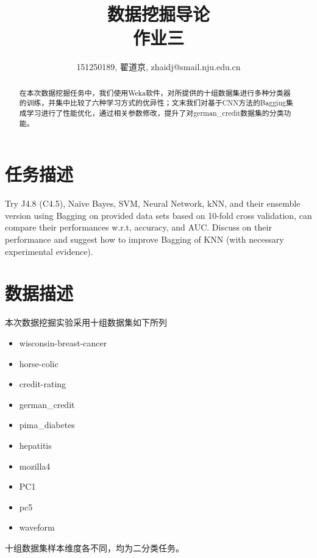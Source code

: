 \documentclass[a4paper,UTF8]{article}
\numberwithin{equation}{section}
\begin{document}
\title{数据挖掘导论\\
作业三}
\author{151250189, 翟道京, zhaidj@smail.nju.edu.cn}
\maketitle

\begin{abstract}
\large{在本次数据挖掘任务中，我们使用Weka软件，对所提供的十组数据集进行多种分类器的训练，并集中比较了六种学习方式的优异性；文末我们对基于CNN方法的Bagging集成学习进行了性能优化，通过相关参数修改，提升了对german\_credit数据集的分类功能。}
\end{abstract}

\section{任务描述}
Try J4.8 (C4.5), Naïve Bayes, SVM, Neural Network, kNN, and their ensemble version using Bagging on provided data sets based on 10-fold cross validation, can compare their performances w.r.t, accuracy, and AUC. Discuss on their performance and suggest how to improve Bagging of KNN (with necessary experimental evidence).

\section{数据描述}
本次数据挖掘实验采用十组数据集如下所列
\begin{itemize} 
\item wisconsin-breast-cancer
\item horse-colic
\item credit-rating
\item german\_credit
\item pima\_diabetes
\item hepatitis
\item mozilla4
\item PC1
\item pc5
\item waveform
\end{itemize}

十组数据集样本维度各不同，均为二分类任务。
\end{document}

